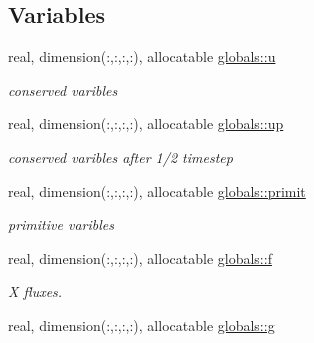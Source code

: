 \subsection*{Variables}
\begin{DoxyCompactItemize}
\item 
\hypertarget{namespaceglobals_ae6519b751f8ef608c2074e27024335b7}{}real, dimension(\+:,\+:,\+:,\+:), allocatable \hyperlink{namespaceglobals_ae6519b751f8ef608c2074e27024335b7}{globals\+::u}\label{namespaceglobals_ae6519b751f8ef608c2074e27024335b7}

\begin{DoxyCompactList}\small\item\em conserved varibles \end{DoxyCompactList}\item 
\hypertarget{namespaceglobals_a127abb71c460a346ae47d10d86c22cc9}{}real, dimension(\+:,\+:,\+:,\+:), allocatable \hyperlink{namespaceglobals_a127abb71c460a346ae47d10d86c22cc9}{globals\+::up}\label{namespaceglobals_a127abb71c460a346ae47d10d86c22cc9}

\begin{DoxyCompactList}\small\item\em conserved varibles after 1/2 timestep \end{DoxyCompactList}\item 
\hypertarget{namespaceglobals_a149bece4e7407071629f69a8c7deb03a}{}real, dimension(\+:,\+:,\+:,\+:), allocatable \hyperlink{namespaceglobals_a149bece4e7407071629f69a8c7deb03a}{globals\+::primit}\label{namespaceglobals_a149bece4e7407071629f69a8c7deb03a}

\begin{DoxyCompactList}\small\item\em primitive varibles \end{DoxyCompactList}\item 
\hypertarget{namespaceglobals_a5fb85172ca54e822fdb8c522da890717}{}real, dimension(\+:,\+:,\+:,\+:), allocatable \hyperlink{namespaceglobals_a5fb85172ca54e822fdb8c522da890717}{globals\+::f}\label{namespaceglobals_a5fb85172ca54e822fdb8c522da890717}

\begin{DoxyCompactList}\small\item\em X fluxes. \end{DoxyCompactList}\item 
\hypertarget{namespaceglobals_a0124c44fda4a3092edd2789f79dec648}{}real, dimension(\+:,\+:,\+:,\+:), allocatable \hyperlink{namespaceglobals_a0124c44fda4a3092edd2789f79dec648}{globals\+::g}\label{namespaceglobals_a0124c44fda4a3092edd2789f79dec648}


\end{DoxyCompactItemize}
